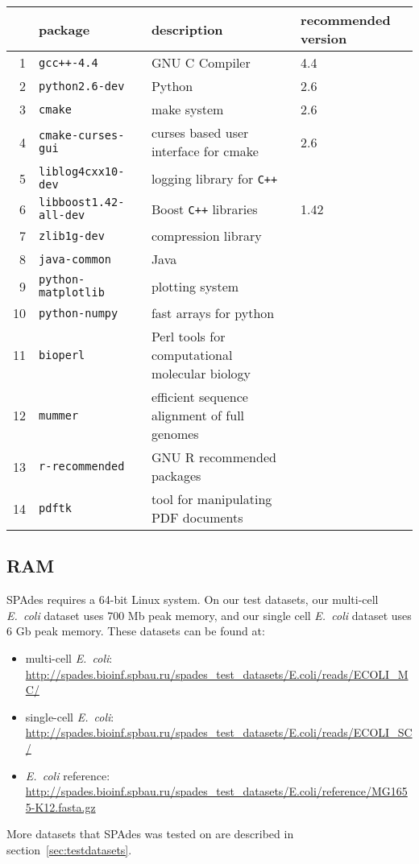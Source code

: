 \documentclass{article}
\def\spades{SPAdes}
\def\ecoli{\it E.~coli}
\begin{document}
\begin{center}
\begin{tabular}{rlll}
\toprule
& package & description & recommended version\\
\midrule
1 & {\tt gcc++-4.4} & GNU C Compiler & 4.4\\
2 & {\tt python2.6-dev} & Python & 2.6\\
3 & {\tt cmake} & make system & 2.6\\
4 & {\tt cmake-curses-gui} & curses based user interface for cmake & 2.6\\
5 & {\tt liblog4cxx10-dev} & logging library for {\tt C++} & \\
6 & {\tt libboost1.42-all-dev} & Boost {\tt C++} libraries & 1.42\\
7 & {\tt zlib1g-dev} & compression library & \\
8 & {\tt java-common} & Java &\\
9 & {\tt python-matplotlib} & plotting system & \\
10 & {\tt python-numpy} & fast arrays for python & \\
11 & {\tt bioperl} & Perl tools for computational molecular biology & \\
12 & {\tt mummer} & efficient sequence alignment of full genomes & \\
13 & {\tt r-recommended} & GNU R recommended packages & \\
14 & {\tt pdftk} & tool for manipulating PDF documents & \\
\bottomrule
\end{tabular}
\end{center}

\subsection{RAM}
{\spades} requires a 64-bit Linux system.
On our test datasets,
our multi-cell {\ecoli} dataset uses 700 Mb peak memory, and our single cell
{\ecoli} dataset uses 6 Gb peak memory. 
These datasets can be found at:
\begin{itemize}
  \item multi-cell {\ecoli}:\\ \url{http://spades.bioinf.spbau.ru/spades_test_datasets/E.coli/reads/ECOLI_MC/}
  \item single-cell {\ecoli}:\\ \url{http://spades.bioinf.spbau.ru/spades_test_datasets/E.coli/reads/ECOLI_SC/}
  \item {\ecoli} reference:\\ \url{http://spades.bioinf.spbau.ru/spades_test_datasets/E.coli/reference/MG1655-K12.fasta.gz}
\end{itemize}
More datasets that {\spades} was tested on are described in section~\ref{sec:testdatasets}.
\end{document}
